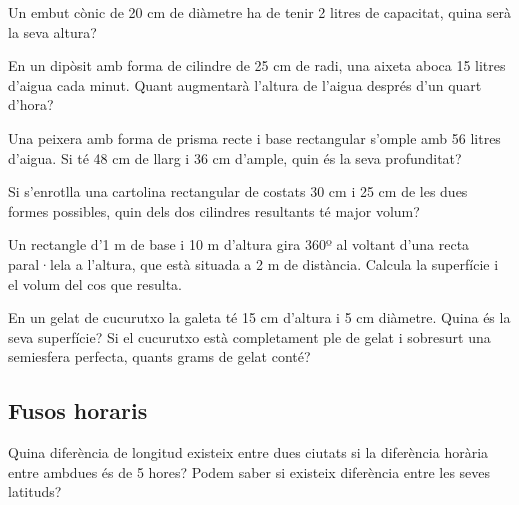 \begin{activitats}
\begin{mylist}
\exer  Un embut cònic de 20 cm de diàmetre ha de tenir 2 litres de capacitat, quina serà la seva altura?


\exer  En un dipòsit amb forma de cilindre de 25 cm de radi, una aixeta aboca 15 litres d'aigua cada minut. Quant augmentarà l'altura de l'aigua després d'un quart d'hora?


\exer Una peixera amb forma de prisma recte i base rectangular s'omple amb 56 litres d'aigua. Si té 48 cm de llarg i 36 cm d'ample, quin és la seva profunditat?


\exer  Si s'enrotlla una cartolina rectangular de costats 30 cm i 25 cm de les dues formes possibles, quin dels dos cilindres resultants té major volum?


\exer  Un rectangle d'1 m de base i 10 m d'altura gira 360º al voltant d'una recta paral·lela a l'altura, que està situada a 2 m de distància. Calcula la superfície i el volum del cos que resulta.


\exer  En un gelat de cucurutxo la galeta té 15 cm d'altura i 5 cm diàmetre. Quina és la seva superfície? Si el cucurutxo està completament ple de gelat i sobresurt una semiesfera perfecta, quants grams de gelat conté?

 
\end{mylist}

\subsection{Fusos horaris}

 
\begin{mylist}
\exer Quina diferència de longitud existeix entre dues ciutats si la diferència horària entre ambdues és de 5 hores? Podem saber si existeix diferència entre les seves latituds?



\end{mylist}
\end{activitats}
